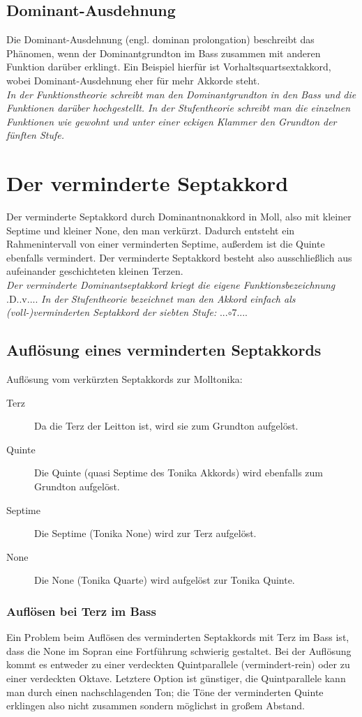 \documentclass[a4paper]{article}
\newcommand{\mShoch}[4]{\HH.\romannumeral #1..#2.#3.#4.} %
\newcommand{\Dhoch}[2]{\HH.D.#2.#1...}
\begin{document}
	\subsection{Dominant-Ausdehnung}
	Die Dominant-Ausdehnung (engl. dominan prolongation) beschreibt das Phänomen, wenn der Dominantgrundton im Bass zusammen mit anderen Funktion darüber erklingt. Ein Beispiel hierfür ist Vorhaltsquartsextakkord, wobei Dominant-Ausdehnung eher für mehr Akkorde steht.\\ 
	\textit{In der Funktionstheorie schreibt man den Dominantgrundton in den Bass und die Funktionen darüber hochgestellt. In der Stufentheorie schreibt man die einzelnen Funktionen wie gewohnt und unter einer eckigen Klammer den Grundton der fünften Stufe.}
	
	\section{Der verminderte Septakkord}
	Der verminderte Septakkord durch Dominantnonakkord in Moll, also mit kleiner Septime und kleiner None, den man verkürzt. Dadurch entsteht ein Rahmenintervall von einer verminderten Septime, außerdem ist die Quinte ebenfalls vermindert. Der verminderte Septakkord besteht also ausschließlich aus aufeinander geschichteten kleinen Terzen.\\
	\textit{Der verminderte Dominantseptakkord kriegt die eigene Funktionsbezeichnung} \Dhoch{v}{}. \textit{In der Stufentheorie bezeichnet man den Akkord einfach als (voll-)verminderten Septakkord der siebten Stufe:} \mShoch{7}{$\circ$7}{}{}.
	
	\subsection{Auflösung eines verminderten Septakkords}
	Auflösung vom verkürzten Septakkords zur Molltonika:
	\begin{description}
		\item[Terz] Da die Terz der Leitton ist, wird sie zum Grundton aufgelöst.
		\item[Quinte] Die Quinte (quasi Septime des Tonika Akkords) wird ebenfalls zum Grundton aufgelöst.
		\item[Septime] Die Septime (Tonika None) wird zur Terz aufgelöst.
		\item[None] Die None (Tonika Quarte) wird aufgelöst zur Tonika Quinte.
	\end{description}

	\subsubsection{Auflösen bei Terz im Bass}
	Ein Problem beim Auflösen des verminderten Septakkords mit Terz im Bass ist, dass die None im Sopran eine Fortführung schwierig gestaltet. Bei der Auflösung kommt es entweder zu einer verdeckten Quintparallele (vermindert-rein) oder zu einer verdeckten Oktave. Letztere Option ist günstiger, die Quintparallele kann man durch einen nachschlagenden Ton; die Töne der verminderten Quinte erklingen also nicht zusammen sondern möglichst in großem Abstand.
	
\end{document}
